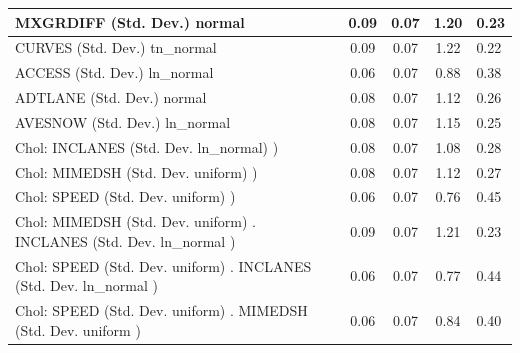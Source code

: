 \begin{table}
\begin{center}
\begin{tabular}{|l|l|c|c|c|l|}
			\hline
			MXGRDIFF (Std. Dev.) normal &  & 0.09 & 0.07 & 1.20 & 0.23 \\
			\hline
			CURVES (Std. Dev.) tn_normal &  & 0.09 & 0.07 & 1.22 & 0.22 \\
			\hline
			ACCESS (Std. Dev.) ln_normal &  & 0.06 & 0.07 & 0.88 & 0.38 \\
			\hline
			ADTLANE (Std. Dev.) normal &  & 0.08 & 0.07 & 1.12 & 0.26 \\
			\hline
			AVESNOW (Std. Dev.) ln_normal &  & 0.08 & 0.07 & 1.15 & 0.25 \\
			\hline
			 Chol: INCLANES (Std. Dev. ln_normal) ) &  & 0.08 & 0.07 & 1.08 & 0.28 \\
			\hline
			 Chol: MIMEDSH (Std. Dev. uniform) ) &  & 0.08 & 0.07 & 1.12 & 0.27 \\
			\hline
			 Chol: SPEED (Std. Dev. uniform) ) &  & 0.06 & 0.07 & 0.76 & 0.45 \\
			\hline
			 Chol: MIMEDSH (Std. Dev. uniform) . INCLANES (Std. Dev.   ln_normal ) &  & 0.09 & 0.07 & 1.21 & 0.23 \\
			\hline
			 Chol: SPEED (Std. Dev. uniform) . INCLANES (Std. Dev.   ln_normal ) &  & 0.06 & 0.07 & 0.77 & 0.44 \\
			\hline
			 Chol: SPEED (Std. Dev. uniform) . MIMEDSH (Std. Dev.   uniform ) &  & 0.06 & 0.07 & 0.84 & 0.40 \\
			\hline
		\end{tabular}
	\end{center}
\end{table}